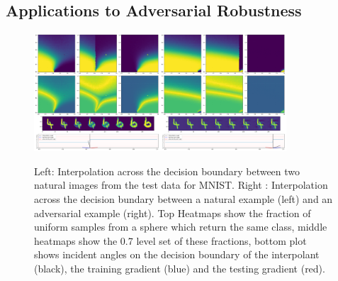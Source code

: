 \subsection{Applications to Adversarial Robustness}

\begin{figure}[ht!]
    \centering
    \includegraphics[width=0.42\textwidth]{c5_figures/stab-mnist-C32-50-50-10-0.001-eval-1e-06-none-4-6-db_interp-stability-50.png}\includegraphics[width=0.42\textwidth]{c5_figures/stab-mnist-C32-50-50-10-0.001-eval-1e-06-pgd-4-6-db_interp-stability-50.png}

    \caption{Left: Interpolation across the decision boundary between
      two natural images from the test data for MNIST. Right :
      Interpolation across the decision bundary between a natural
      example (left) and an adversarial example (right). Top Heatmaps
      show the fraction of uniform samples from a sphere which return
      the same class, middle  heatmaps show the 0.7 level set of these
      fractions, bottom plot shows incident angles on the decision
      boundary of the interpolant (black), the training gradient
      (blue) and the testing gradient (red). }
    \label{fig:dbs}
\end{figure}


